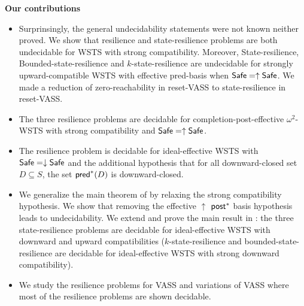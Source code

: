 \noindent
{\bf Our contributions}
\begin{itemize}

\item Surprinsingly, the general undecidability statements were not known neither proved. We show that resilience and state-resilience problems are both undecidable for WSTS with strong compatibility. 
Moreover, {\sc State-resilience},
{\sc Bounded-state-resilience} and
{\sc $k$-state-resilience}
are undecidable for strongly upward-compatible WSTS with effective pred-basis
when
$\textsf{Safe}=\uparrow \textsf{Safe}$. We made a reduction of zero-reachability in reset-VASS to state-resilience in reset-VASS.


\item The three resilience problems are decidable for completion-post-effective $\omega^2$-WSTS with strong compatibility and $\textsf{Safe} = \uparrow \textsf{Safe}$.

\item The resilience problem is decidable for ideal-effective WSTS with 
$\textsf{Safe}=\downarrow \textsf{Safe}$
and
the additional hypothesis that
for all downward-closed set $D \subseteq S$, the set $\textsf{pred}^*(D)$ is downward-closed.
%

\item We generalize the main theorem of \cite{DBLP:journals/corr/abs-2108-00889,DBLP:conf/gg/Ozkan22} by relaxing the strong compatibility hypothesis.
We show that removing the effective 
$\uparrow$ $\textsf{post}^*$ basis hypothesis leads to undecidability. We extend and prove the main result in  \cite{DBLP:journals/corr/PrasadZ16} : the three state-resilience problems are decidable for ideal-effective WSTS with downward and upward compatibilities ({\sc $k$-state-resilience} and {\sc bounded-state-resilience} are decidable for ideal-effective WSTS with strong downward compatibility).
%

\item We study the resilience problems for VASS and variations of VASS where most of the resilience problems are shown decidable.
\end{itemize}


